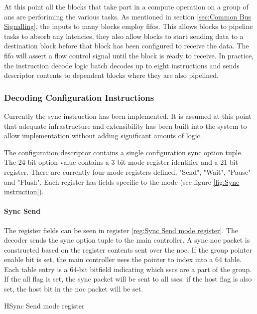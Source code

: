 At this point all the blocks that take part in a compute operation on a group of \acp{an} are perforiming the various tasks.
As mentioned in section \ref{sec:Common Bus Signalling}, the inputs to many blocks employ \acp{fifo}. 
This allows blocks to pipeline tasks to absorb any latencies, they also allow blocks to start sending data to a destination block before that block has been configured to receive the data.
The \ac{fifo} will assert a flow control signal until the block is ready to receive.
In practice, the instruction decode logic batch decodes up to eight instructions and sends descriptor contents to dependent blocks where they are also pipelined.

\subsubsection{Decoding Configuration Instructions}
\label{sec:Decoding Configuration Instructions}

Currently the sync instruction has been implemented.
It is assumed at this point that adequate infrastructure and extensibility has been built into the system to allow implementation without adding significant amouts of logic.

The configuration descriptor contains a single configuration sync option tuple. The 24-bit option value contains a 3-bit mode register identifier and a 21-bit register.
There are currently four mode registers defined, "Send", "Wait", "Pause" and "Flush". Each register has fields specific to the mode (see figure \ref{fig:Sync instruction}).

\paragraph{Sync Send}

The register fields can be seen in register \ref{reg:Sync Send mode register}.
The decoder sends the sync option tuple to the main controller.
A sync \ac{noc} packet is constructed based on the register contents sent over the \ac{noc}.
If the group pointer enable bit is set, the main controller uses the pointer to index into a 64 table. 
Each table entry is a 64-bit bitfield indicating which \acp{ssc} are a part of the group.
If the all flag is set, the sync packet will be sent to all \acp{ssc}.
if the host flag is also set, the host bit in the \ac{noc} packet will be set.
\begin{register}{H}{Sync Send mode register}{}%
  \label{reg:Sync Send mode register}
  \vspace{-20pt}
\end{register}

